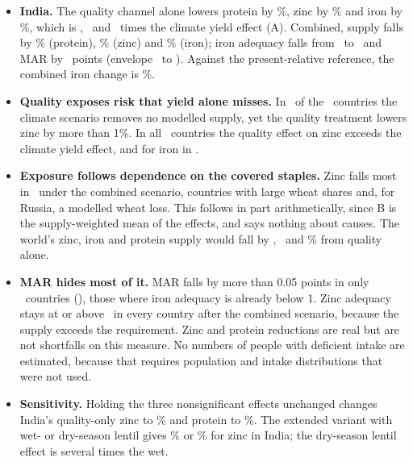 \begin{itemize}
\item \textbf{India.} The quality channel alone lowers protein by \cotwoIndQualProteinAbs\%, zinc by \cotwoIndQualZincAbs\% and
iron by \cotwoIndQualIronAbs\%, which is \cotwoIndRatioProtein, \cotwoIndRatioZinc\ and \cotwoIndRatioIron\ times the climate
yield effect (A). Combined, supply falls by \cotwoIndCombProteinAbs\% (protein), \cotwoIndCombZincAbs\% (zinc) and
\cotwoIndCombIronAbs\% (iron); iron adequacy falls from \cotwoIndIronNARzero\ to \cotwoIndCombIronNAR\ and MAR by
\cotwoIndCombMARAbs\ points (envelope \cotwoIndCombHighMARAbs\ to \cotwoIndCombLowMARAbs). Against the present-relative reference, the
combined iron change is \cotwoIndCombPreIron\%.
\item \textbf{Quality exposes risk that yield alone misses.} In \cotwoNZeroQtyQual\ of the \cotwoNCountries\ countries the
climate scenario removes no modelled supply, yet the quality treatment lowers zinc by more than 1\%. In all
\cotwoNQualGtQtyZinc\ countries the quality effect on zinc exceeds the climate yield effect, and for iron in
\cotwoNQualGtQtyIron.
\item \textbf{Exposure follows dependence on the covered staples.} Zinc falls most in \cotwoTopZincCountries\ under the
combined scenario, countries with large wheat shares and, for Russia, a modelled wheat loss. This follows in part
arithmetically, since B is the supply-weighted mean of the effects, and says nothing about causes. The world's zinc,
iron and protein supply would fall by \cotwoWorldZincAbs, \cotwoWorldIronAbs\ and \cotwoWorldProteinAbs\% from quality alone.
\item \textbf{MAR hides most of it.} MAR falls by more than 0.05 points in only \cotwoNMarDrop\ countries
(\cotwoMarDropList), those where iron adequacy is already below 1. Zinc adequacy stays at or above \cotwoZincNARmin\ in every
country after the combined scenario, because the supply exceeds the requirement. Zinc and protein reductions are real
but are not shortfalls on this measure. No numbers of people with deficient intake are estimated, because that
requires population and intake distributions that were not used.
\item \textbf{Sensitivity.} Holding the three nonsignificant effects unchanged changes India's quality-only zinc to
\cotwoIndSigOnlyZinc\% and protein to \cotwoIndSigOnlyProtein\%. The extended variant with wet- or dry-season lentil
gives \cotwoIndExtWetZinc\% or \cotwoIndExtDryZinc\% for zinc in India; the dry-season lentil effect is several times the wet.
\end{itemize}

